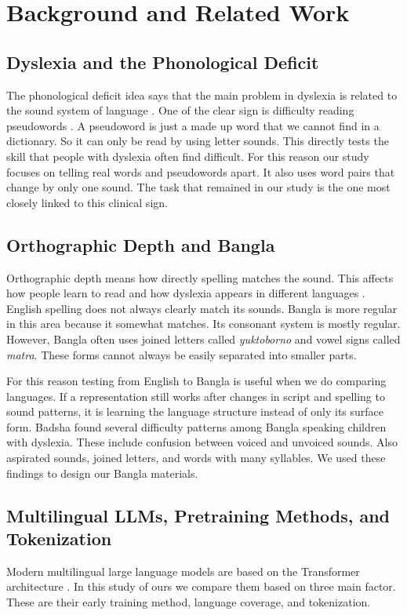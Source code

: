 \documentclass[preprint,12pt]{elsarticle}
\begin{document}
\section{Background and Related Work}
\label{sec:related}

\subsection{Dyslexia and the Phonological Deficit}
The phonological deficit idea says that the main problem in dyslexia is related to the sound system of language \cite{snowling2020dyslexia,goswami2011temporal}. One of the clear sign is difficulty reading pseudowords \cite{rack1992nonword}. A pseudoword is just a made up word that we cannot find in a dictionary. So it can only be read by using letter sounds. This directly tests the skill that people with dyslexia often find difficult. For this reason our study focuses on telling real words and pseudowords apart. It also uses word pairs that change by only one sound. The task that remained in our study is the one most closely linked to this clinical sign.

\subsection{Orthographic Depth and Bangla}
Orthographic depth means how directly spelling matches the sound. This affects how people learn to read and how dyslexia appears in different languages \cite{ziegler2005reading}. English spelling does not always clearly match its sounds. Bangla is more regular in this area because it somewhat matches. Its consonant system is mostly regular. However, Bangla often uses joined letters called \textit{yuktoborno} and vowel signs called \textit{matra}. These forms cannot always be easily separated into smaller parts.

For this reason testing from English to Bangla is useful when we do comparing languages. If a representation still works after changes in script and spelling to sound patterns, it is learning the language structure instead of only its surface form. Badsha \cite{badsha2024mall} found several difficulty patterns among Bangla speaking children with dyslexia. These include confusion between voiced and unvoiced sounds. Also aspirated sounds, joined letters, and words with many syllables. We used these findings to design our Bangla materials.

\subsection{Multilingual LLMs, Pretraining Methods, and Tokenization}
Modern multilingual large language models are based on the Transformer architecture \cite{vaswani2017attention}. In this study of ours we compare them based on three main factor. These are their early training method, language coverage, and tokenization.
\end{document}
